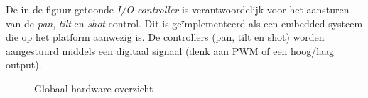 De in de figuur getoonde \emph{I/O controller} is
verantwoordelijk voor het aansturen van de \emph{pan}, \emph{tilt} en
\emph{shot} control. Dit is geïmplementeerd als een embedded systeem die op het
platform aanwezig is. De controllers (pan, tilt en shot) worden aangestuurd
middels een digitaal signaal (denk aan PWM of een hoog/laag output).

\begin{figure}[H]
    \begin{center}
        
    \end{center}
    \caption{Globaal hardware overzicht}
    \label{fig:hardware-schematic}
\end{figure}
